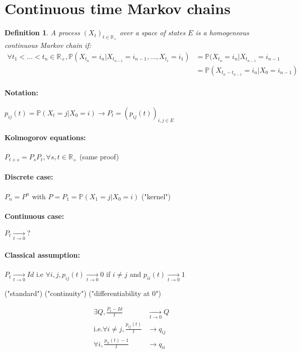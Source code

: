 \documentclass{article}
\newtheorem{defi}{Definition}
\begin{document}
\section{Continuous time Markov chains}
\begin{defi}
A process $(X_t)_{t\in \mathbb{R}_+}$ over a space of states $E$ is a homogeneous continuous Markov chain if:
\begin{align*}
\tag{Markov}
\forall t_1<...<t_n \in \mathbb{R}_+, \mathbb{P}(X_{t_n}=i_n|X_{t_{n-1}}=i_{n-1},...,X_{t_1}=i_1) & = \mathbb{P}(X_{t_n}=i_n | X_{t_{n-1}}=i_{n-1}\\
\tag{Homogeneous}
& = \mathbb{P}(X_{t_n-t_{n-1}}=i_n|X_0=i_{n-1})
\end{align*}
\end{defi}

\paragraph{Notation:} $p_{ij}(t)=\mathbb{P}(X_t=j|X_0=i) \to P_t = (p_{ij}(t))_{i,j\in E}$

\paragraph{Kolmogorov equations:} $P_{t+s}=P_sP_t, \forall s,t \in \mathbb{R}_+$ (same proof)

\paragraph{Discrete case:} $P_n=P^n$ with $P=P_1=\mathbb{P}(X_1=j|X_0=i)$ ("kernel")

\paragraph{Continuous case:} $P_t \underset{t \to 0}{\to} ?$

\paragraph{Classical assumption:} $P_t \underset{t\to 0}{\to} Id$ i.e $\forall i,j, p_{ij}(t)\underset{t\to 0}{\to} 0$ if $i\neq j$ and $p_{ii}(t) \underset{t\to 0}{\to} 1$

("standard") ("continuity") ("differentiability at 0")

\begin{align*}
\exists Q, \frac{P_t - Id}{t} & \underset{t\to 0}{\to} Q\\
\text{i.e.} \forall i\neq j, \frac{p_{ij}(t)}{t} & \to q_{ij}\\
\forall i, \frac{p_{ii}(t)-1}{t} & \to q_{ii}
\end{align*}
\end{document}
